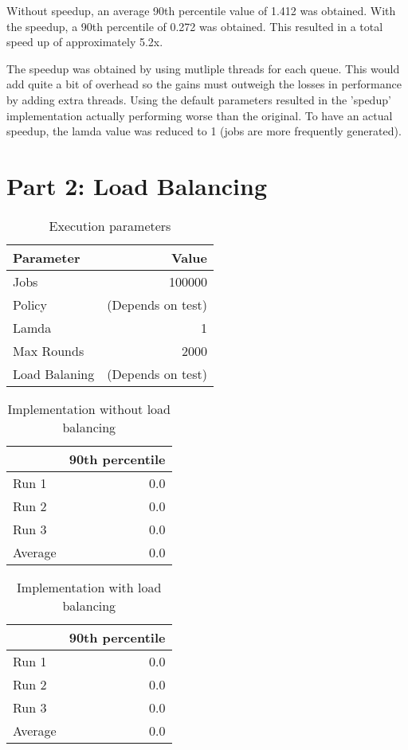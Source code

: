 \documentclass[12pt]{article}
\begin{document}
Without speedup, an average 90th percentile value of 1.412 was obtained. With the speedup, a 90th percentile of 0.272 was obtained. This resulted in a total speed up of approximately 5.2x.

The speedup was obtained by using mutliple threads for each queue. This would add quite a bit of overhead so the gains must outweigh the losses in performance by adding extra threads. Using the default parameters resulted in the 'spedup' implementation actually performing worse than the original. To have an actual speedup, the lamda value was reduced to 1 (jobs are more frequently generated).



\section*{Part 2: Load Balancing}

\begin{table}[H]
  \centering
  \begin{tabular}{lr}
    {\bf Parameter} & {\bf Value} \\
    \hline
    Jobs & 100000 \\
    Policy & (Depends on test) \\
    Lamda & 1 \\
    Max Rounds & 2000 \\
    Load Balaning & (Depends on test) \\
  \end{tabular}
  \caption{Execution parameters}
  \label{tbl-part2-params}
\end{table}

\begin{table}[H]
  \centering
  \begin{tabular}{lr}
    & {\bf 90th percentile} \\
    \hline
    Run 1 & 0.0 \\
    Run 2 & 0.0 \\
    Run 3 & 0.0 \\
    \hline
    Average & 0.0 \\
  \end{tabular}
  \caption{Implementation without load balancing}
  \label{tbl-part2-originall}
\end{table}

\begin{table}[H]
  \centering
  \begin{tabular}{lr}
    & {\bf 90th percentile} \\
    \hline
    Run 1 & 0.0 \\
    Run 2 & 0.0 \\
    Run 3 & 0.0 \\
    \hline
    Average & 0.0 \\
  \end{tabular}
  \caption{Implementation with load balancing}
  \label{tbl-part2-loadbalance}
\end{table}
\end{document}
